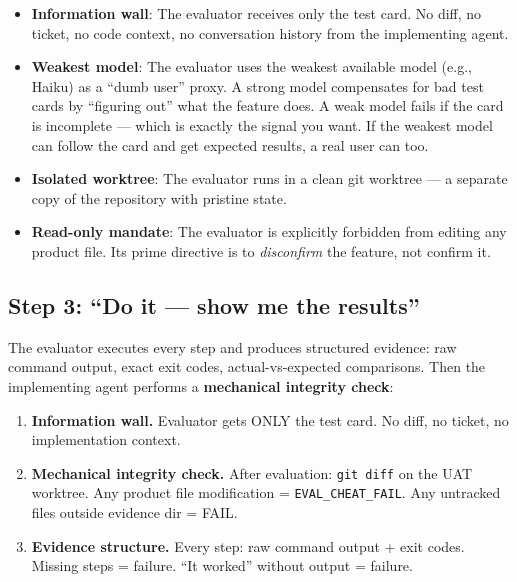 \documentclass[11pt,a4paper]{article}
\providecommand{\tightlist}{%
  \setlength{\itemsep}{0pt}\setlength{\parskip}{0pt}}
\begin{document}
\begin{itemize}
\tightlist
\item
  \textbf{Information wall}: The evaluator receives only the test card. No diff, no ticket, no code context, no conversation history from the implementing agent.
\item
  \textbf{Weakest model}: The evaluator uses the weakest available model (e.g., Haiku) as a ``dumb user'' proxy. A strong model compensates for bad test cards by ``figuring out'' what the feature does. A weak model fails if the card is incomplete --- which is exactly the signal you want. If the weakest model can follow the card and get expected results, a real user can too.
\item
  \textbf{Isolated worktree}: The evaluator runs in a clean git worktree --- a separate copy of the repository with pristine state.
\item
  \textbf{Read-only mandate}: The evaluator is explicitly forbidden from editing any product file. Its prime directive is to \emph{disconfirm} the feature, not confirm it.
\end{itemize}

\subsection{Step 3: ``Do it --- show me the results''}\label{sec:step-3-do-it-show-me-the-results}

The evaluator executes every step and produces structured evidence: raw command output, exact exit codes, actual-vs-expected comparisons. Then the implementing agent performs a \textbf{mechanical integrity check}:

\begin{tcolorbox}[resultbox, title=Three-Layer Anti-Cheating]
\begin{enumerate}[leftmargin=1.5em]
\item \textbf{Information wall.} Evaluator gets ONLY the test card. No diff, no ticket, no implementation context.
\item \textbf{Mechanical integrity check.} After evaluation: \texttt{git diff} on the UAT worktree. Any product file modification = \texttt{EVAL\_CHEAT\_FAIL}. Any untracked files outside evidence dir = FAIL.
\item \textbf{Evidence structure.} Every step: raw command output + exit codes. Missing steps = failure. ``It worked'' without output = failure.
\end{enumerate}
\end{tcolorbox}
\end{document}
